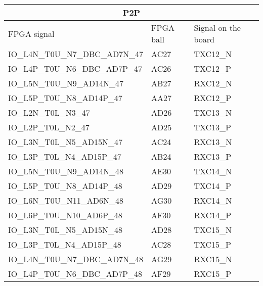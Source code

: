 \begin{footnotesize}
\begin{longtable}{|p{7cm}|p{1cm}|p{5cm}|}
		
			\multicolumn{3}{|c|}{\textbf{\large{P2P}}}\\ \hline
FPGA signal	&	FPGA ball	&	Signal on the board	\\ \hline
IO\_L4N\_T0U\_N7\_DBC\_AD7N\_47	&	AC27	&	TXC12\_N	\\ \hline
IO\_L4P\_T0U\_N6\_DBC\_AD7P\_47	&	AC26	&	TXC12\_P	\\ \hline
IO\_L5N\_T0U\_N9\_AD14N\_47	&	AB27	&	RXC12\_N	\\ \hline
IO\_L5P\_T0U\_N8\_AD14P\_47	&	AA27	&	RXC12\_P	\\ \hline
IO\_L2N\_T0L\_N3\_47	&	AD26	&	TXC13\_N	\\ \hline
IO\_L2P\_T0L\_N2\_47	&	AD25	&	TXC13\_P	\\ \hline
IO\_L3N\_T0L\_N5\_AD15N\_47	&	AC24	&	RXC13\_N	\\ \hline
IO\_L3P\_T0L\_N4\_AD15P\_47	&	AB24	&	RXC13\_P	\\ \hline
IO\_L5N\_T0U\_N9\_AD14N\_48	&	AE30	&	TXC14\_N	\\ \hline
IO\_L5P\_T0U\_N8\_AD14P\_48	&	AD29	&	TXC14\_P	\\ \hline
IO\_L6N\_T0U\_N11\_AD6N\_48	&	AG30	&	RXC14\_N	\\ \hline
IO\_L6P\_T0U\_N10\_AD6P\_48	&	AF30	&	RXC14\_P	\\ \hline
IO\_L3N\_T0L\_N5\_AD15N\_48	&	AD28	&	TXC15\_N	\\ \hline
IO\_L3P\_T0L\_N4\_AD15P\_48	&	AC28	&	TXC15\_P	\\ \hline
IO\_L4N\_T0U\_N7\_DBC\_AD7N\_48	&	AG29	&	RXC15\_N	\\ \hline
IO\_L4P\_T0U\_N6\_DBC\_AD7P\_48	&	AF29	&	RXC15\_P	\\ \hline

		
			
	\end{longtable}
\end{footnotesize}
